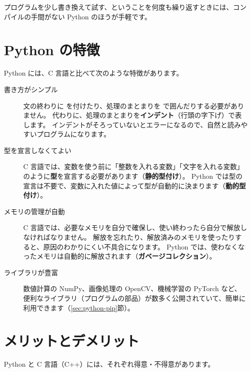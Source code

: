 プログラムを少し書き換えて試す、ということを何度も繰り返すときには、コンパイルの手間がない Python のほうが手軽です。

\section{Python の特徴}
\label{sec:python-features}

Python には、C 言語と比べて次のような特徴があります。

\begin{description}
  \item[書き方がシンプル]
    文の終わりに \cmd{;} を付けたり、処理のまとまりを \cmd{\{ \}} で囲んだりする必要がありません。
    代わりに、処理のまとまりを\textbf{インデント}（行頭の字下げ）で表します。
    インデントがそろっていないとエラーになるので、自然と読みやすいプログラムになります。
  \item[型を宣言しなくてよい]
    C 言語では、変数を使う前に「整数を入れる変数」「文字を入れる変数」のように\textbf{型}を宣言する必要があります（\textbf{静的型付け}）。
    Python では型の宣言は不要で、変数に入れた値によって型が自動的に決まります（\textbf{動的型付け}）。
  \item[メモリの管理が自動]
    C 言語では、必要なメモリを自分で確保し、使い終わったら自分で解放しなければなりません。
    解放を忘れたり、解放済みのメモリを使ったりすると、原因のわかりにくい不具合になります。
    Python では、使わなくなったメモリは自動的に解放されます（\textbf{ガベージコレクション}）。
  \item[ライブラリが豊富]
    数値計算の NumPy、画像処理の OpenCV、機械学習の PyTorch など、便利なライブラリ（プログラムの部品）が数多く公開されていて、簡単に利用できます（\ref{sec:python-pip}節）。
\end{description}

\section{メリットとデメリット}
\label{sec:python-pros-cons}

Python と C 言語（C++）には、それぞれ得意・不得意があります。

